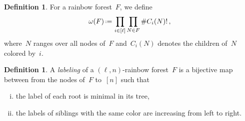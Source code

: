 \documentclass{amsart}
\newcommand{\darkblue}{\color{darkblue}} %
\theoremstyle{definition}
\newtheorem{definition}[theorem]{Definition}
\newcommand{\eqdef}{\mbox{\,\raisebox{0.2ex}{\scriptsize\ensuremath{\mathrm:}}\ensuremath{=}\,}} %
\newcommand{\defn}[1]{\textsl{\darkblue #1}} %
\newcommand{\OEIS}[1]{\cite[{\rm \href{http://oeis.org/#1}{\texttt{#1}}}]{OEIS}}
\begin{document}
\begin{table}
	\centerline{}
	\caption{The Fuss-Catalan numbers~$F_{\ell,m} = \frac{1}{(\ell-1)m+1} \binom{\ell m}{m}$ for~$\ell,m \in [9]$. See \OEIS{A062993}.}
\end{table}

\begin{definition}
For a rainbow forest~$F$, we define
\[
\omega(F) \eqdef \prod_{i \in [\ell]} \prod_{N \in F} \#C_i(N)! \, ,
\]
where~$N$ ranges over all nodes of~$F$ and~$C_i(N)$ denotes the children of~$N$ colored by~$i$.
\end{definition}

\begin{definition}
\label{def:labelingRainbowForest}
A \defn{labeling} of a $(\ell,n)$-rainbow forest~$F$ is a bijective map between from the nodes of~$F$ to~$[n]$ such that
\begin{enumerate}[(i)]
\item the label of each root is minimal in its tree,
\item the labels of siblings with the same color are increasing from left to right.
\end{enumerate}
\end{definition}
\end{document}
